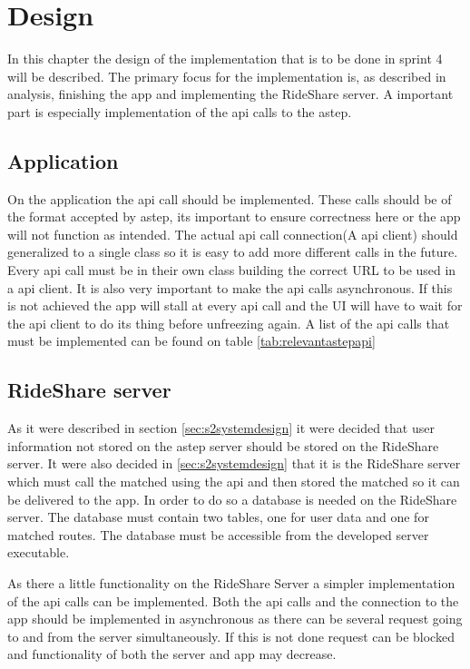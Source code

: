 \section{Design}
In this chapter the design of the implementation that is to be done in sprint 4 will be described.
The primary focus for the implementation is, as described in analysis, finishing the app and implementing the RideShare server.
A important part is especially implementation of the api calls to the \gls{astep}.

\subsection{Application}
On the application the api call should be implemented.
These calls should be of the format accepted by \gls{astep}, its important to ensure correctness here or the app will not function as intended.
The actual api call connection(A api client) should generalized to a single class so it is easy to add more different calls in the future.
Every api call must be in their own class building the correct URL to be used in a api client.
It is also very important to make the api calls asynchronous. 
If this is not achieved the app will stall at every api call and the UI will have to wait for the api client to do its thing before unfreezing again.
A list of the api calls that must be implemented can be found on table \ref{tab:relevantastepapi}

\subsection{RideShare server}
As it were described in section \ref{sec:s2systemdesign} it were decided that user information not stored on the \gls{astep} server should be stored on the RideShare server.
It were also decided in \ref{sec:s2systemdesign} that it is the RideShare server which must call the matched using the api and then stored the matched so it can be delivered to the app. 
In order to do so a  database is needed on the RideShare server.
The database must contain two tables, one for user data and one for matched routes.
The database must be accessible from the developed server executable.

As there a little functionality on the RideShare Server a simpler implementation of the api calls can be implemented.
Both the api calls and the connection to the app should be implemented in asynchronous as there can be several request going to and from the server simultaneously. 
If this is not done request can be blocked and functionality of both the server and app may decrease.